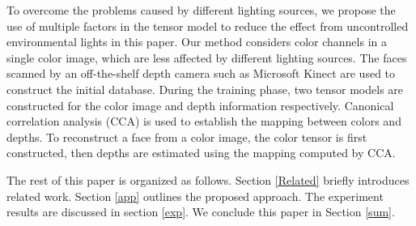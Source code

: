 
To overcome the problems caused by different lighting sources, 
we propose the use of multiple factors in the tensor model to reduce the effect from uncontrolled environmental lights in this paper.
Our method considers color channels in a single color image, which are less affected by different lighting sources. The faces scanned by an off-the-shelf 
    depth camera such as Microsoft Kinect are used to construct the initial database. 
During the training phase, two tensor models are constructed for the color image and depth information respectively. 
Canonical correlation analysis (CCA) is used to establish the mapping between colors and depths. 
To reconstruct a face from a color image, the color tensor is first constructed, then depths are estimated using the mapping computed by CCA. 

The rest of this paper is organized as follows. 
Section \ref{Related} briefly introduces related work. 
Section \ref{app} outlines the proposed approach. 
The experiment results are discussed in section \ref{exp}. 
We conclude this paper in Section \ref{sum}.